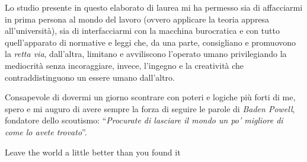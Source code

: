 \thispagestyle{empty}
\mbox{}

\newpage
\thispagestyle{empty}
\vspace*{5cm}
\begin{changemargin}{0.5cm}{0.5cm}
	\noindent
	Lo studio presente in questo elaborato di laurea mi ha permesso sia di affacciarmi in prima persona al mondo del lavoro (ovvero applicare la teoria appresa all'università), sia di interfacciarmi con la macchina burocratica e con tutto quell'apparato di normative e leggi che, da una parte, consigliano e promuovono la \emph{retta via}, dall'altra, limitano e avviliscono l'operato umano privilegiando la mediocrità senza incoraggiare, invece, l'ingegno e la creatività che contraddistinguono un essere umano dall'altro.
	
	\vspace{1em}\noindent
	Consapevole di dovermi un giorno scontrare con poteri e logiche più forti di me, spero e mi
	auguro di avere sempre la forza di seguire le parole di \emph{Baden Powell}, fondatore dello scoutismo: ``\emph{Procurate di lasciare il mondo un po' migliore di come lo avete trovato}''.
	\vspace{1em}
\end{changemargin}

\newpage
\thispagestyle{empty}
\vspace*{8cm}
\centering\large Leave the world a little better than you found it\\